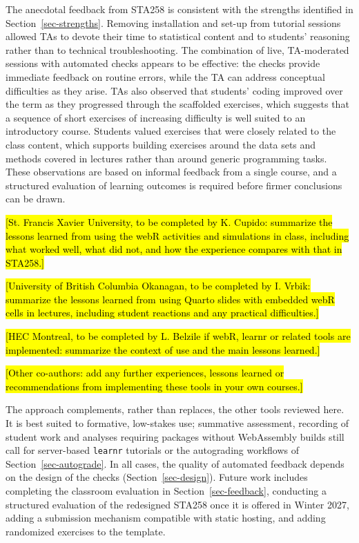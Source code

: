 \documentclass[
  12pt]{article}
\begin{document}
The anecdotal feedback from STA258 is consistent with the strengths
identified in Section~\ref{sec-strengths}. Removing installation and
set-up from tutorial sessions allowed TAs to devote their time to
statistical content and to students' reasoning rather than to technical
troubleshooting. The combination of live, TA-moderated sessions with
automated checks appears to be effective: the checks provide immediate
feedback on routine errors, while the TA can address conceptual
difficulties as they arise. TAs also observed that students' coding
improved over the term as they progressed through the scaffolded
exercises, which suggests that a sequence of short exercises of
increasing difficulty is well suited to an introductory course. Students
valued exercises that were closely related to the class content, which
supports building exercises around the data sets and methods covered in
lectures rather than around generic programming tasks. These
observations are based on informal feedback from a single course, and a
structured evaluation of learning outcomes is required before firmer
conclusions can be drawn.

\hl{[St. Francis Xavier University, to be completed by K. Cupido: summarize the lessons learned from using the webR activities and simulations in class, including what worked well, what did not, and how the experience compares with that in STA258.]}

\hl{[University of British Columbia Okanagan, to be completed by I. Vrbik: summarize the lessons learned from using Quarto slides with embedded webR cells in lectures, including student reactions and any practical difficulties.]}

\hl{[HEC Montreal, to be completed by L. Belzile if webR, learnr or related tools are implemented: summarize the context of use and the main lessons learned.]}

\hl{[Other co-authors: add any further experiences, lessons learned or recommendations from implementing these tools in your own courses.]}

The approach complements, rather than replaces, the other tools reviewed
here. It is best suited to formative, low-stakes use; summative
assessment, recording of student work and analyses requiring packages
without WebAssembly builds still call for server-based \texttt{learnr}
tutorials or the autograding workflows of Section~\ref{sec-autograde}.
In all cases, the quality of automated feedback depends on the design of
the checks (Section~\ref{sec-design}). Future work includes completing
the classroom evaluation in Section~\ref{sec-feedback}, conducting a
structured evaluation of the redesigned STA258 once it is offered in
Winter 2027, adding a submission mechanism compatible with static
hosting, and adding randomized exercises to the template.
\end{document}
